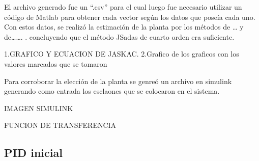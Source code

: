     El archivo generado fue un “.csv” para el cual luego fue necesario utilizar un código de Matlab para obtener cada vector según los datos que poseía cada uno. Con estos datos, se realizó la estimación de la planta por los métodos de … y de……. . concluyendo que el método JSadas de cuarto orden era suficiente.
    
    1.GRAFICO Y ECUACION DE JASKAC.
    2.Grafico de los graficos con los valores marcados que se tomaron
    
    Para corroborar la elección de la planta se genreó un archivo en simulink generando como entrada los esclaones que se colocaron en el sistema.
    
    IMAGEN SIMULINK
    
    FUNCION DE TRANSFERENCIA

    
    \subsection{PID inicial}